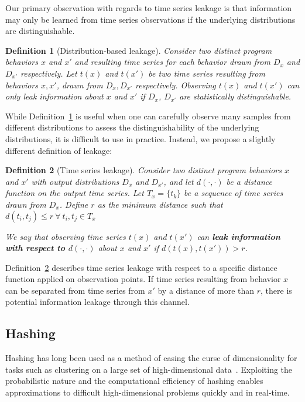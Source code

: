 \documentclass[a4paper]{article}
\theoremstyle{def}
\newtheorem{definition}{Definition}
\theoremstyle{thm}
\begin{document}
Our primary observation with regards to time series leakage is that information may only be learned from time series observations if the underlying distributions are distinguishable.

\begin{definition}[Distribution-based leakage]\label{defn:dist_leakage}
    Consider two distinct program behaviors $x$ and $x'$ and resulting time series for each behavior drawn from $D_x$ and $D_{x'}$ respectively.
    Let $t(x)$ and $t(x')$ be two time series resulting from behaviors $x, x'$, drawn from $D_x, D_{x'}$ respectively.
    Observing $t(x)$ and $t(x')$ can only leak information about $x$ and $x'$ if $D_x$, $D_{x'}$ are statistically distinguishable.
\end{definition}

While Definition~\ref{defn:dist_leakage} is useful when one can carefully observe many samples from different distributions to assess the distinguishability of the underlying distributions, it is difficult to use in practice.
Instead, we propose a slightly different definition of leakage:

\begin{definition}[Time series leakage]\label{defn:leakage}
    Consider two distinct program behaviors $x$ and $x'$ with output distributions $D_x$ and $D_{x'}$, and let $d(\cdot,\cdot)$ be a distance function on the output time series.
    Let $T_x = \{t_k\}$ be a sequence of time series drawn from $D_x$.
    Define $r$ as the minimum distance such that $d(t_i, t_j) \le r~\forall~t_i,t_j \in T_x$

    We say that observing time series $t(x)$ and $t(x')$ can \textbf{leak information with respect to $d(\cdot,\cdot)$} about $x$ and $x'$ if $d(t(x),t(x')) > r$.
\end{definition}

Definition~\ref{defn:leakage} describes time series leakage with respect to a specific distance function applied on observation points.
If time series resulting from behavior $x$ can be separated from time series from $x'$ by a distance of more than $r$, there is potential information leakage through this channel.

\subsection{Hashing}
\label{subsec:hashing}
Hashing has long been used as a method of easing the curse of dimensionality for tasks such as clustering on a large set of high-dimensional data~\cite{Indyk98-ANN,Gionis99-SSH,Datar04-LSH}.
Exploiting the probabilistic nature and the computational efficiency of hashing enables approximations to difficult high-dimensional problems quickly and in real-time.
\end{document}
